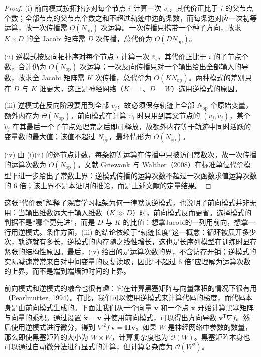 \documentclass[../../main.tex]{subfiles}
\begin{document}
\begin{proof}
(i) 前向模式按拓扑序对每个节点 $i$ 计算一次 $\dot{v}_i$，其代价正比于 $i$ 的父节点个数；全部节点的父节点个数之和不超过轨迹中边的条数，而每条边对应一次初等运算，故一次传播需 $O(N_{\mathrm{op}})$ 次运算。一次传播只携带一个种子方向，故求 $K\times D$ 的全 Jacobi 矩阵需 $D$ 次传播，总代价为 $O(DN_{\mathrm{op}})$。

(ii) 逆模式按反向拓扑序对每个节点 $i$ 计算一次 $\bar{v}_i$，其代价正比于 $i$ 的子节点个数，合计仍为 $O(N_{\mathrm{op}})$ 次运算；一次反向传播只对一个输出给出全部输入的导数，故求全 Jacobi 矩阵需 $K$ 次传播，总代价为 $O(KN_{\mathrm{op}})$。两种模式的差别只在 $D$ 与 $K$ 谁更大，这正是神经网络（$K=1$、$D=W$）选用逆模式的原因。

(iii) 逆模式在反向阶段要用到全部 $v_j$，故必须保存轨迹上全部 $N_{\mathrm{op}}$ 个原始变量，额外内存为 $\Theta(N_{\mathrm{op}})$。前向模式在计算 $\dot{v}_i$ 时只用到其父节点的 $(v_j,\dot{v}_j)$，某个 $\dot{v}_j$ 在其最后一个子节点处理完之后即可释放，故额外内存等于轨迹中同时活跃的变量数的最大值；该值不超过 $N_{\mathrm{op}}$，最坏情形为 $O(N_{\mathrm{op}})$。

(iv) 由 (i)(ii) 的逐节点计数，每条初等运算在传播中只被访问常数次，故一次传播的运算次数为 $O(N_{\mathrm{op}})$。文献 Griewank 与 Walther（2008）在标准单位代价模型下进一步给出了常数上界：逆模式传播的运算次数不超过一次函数求值运算次数的 $6$ 倍；该上界不是本证明的推论，而是上述文献的定量结果。
\end{proof}

\begin{remark}
这张“代价表”解释了深度学习框架为何一律默认逆模式，也说明了前向模式并非无用：当输出维数远大于输入维数（$K\gg D$）时，前向模式反而更省。选择模式的判据不是“哪个更先进”，而是 $D$ 与 $K$ 的比值：想拿Jacobi的一列用前向，想拿一行用逆模式。条件方面，(iii) 的结论依赖于“轨迹长度”这一概念：循环被展开多少次，轨迹就有多长，逆模式的内存随之线性增长，这也是长序列模型在训练时显存紧张的结构性原因。最后，(iv) 给出的是运算次数的界，不含访存开销；逆模式的实际减速常常来自对中间变量的反复读取，因此“不超过 6 倍”应理解为运算次数的上界，而不是端到端墙钟时间的上界。
\end{remark}

前向模式和逆模式的融合也很有趣：它在计算黑塞矩阵与向量乘积的情况下很有用（Pearlmutter, 1994）。在此，我们可以使用逆模式来计算代码的梯度，而代码本身是由前向模式生成的。下面让我们从一个向量 $\mathbf{v}$ 和一个点 $\mathbf{x}$ 开始计算黑塞矩阵与向量的乘积。通过设置 $\dot{\mathbf{x}}=\mathbf{v}$ 并使用前向模式，可以得出方向导数 $\mathbf{v}^{\mathsf T}\nabla f$。然后使用逆模式进行微分，得到 $\nabla^{2}f\,\mathbf{v}=\mathbf{H}\mathbf{v}$。如果 $W$ 是神经网络中参数的数量，那么即使黑塞矩阵的大小为 $W\times W$，计算复杂度也为 $\mathcal{O}(W)$。黑塞矩阵本身也可以通过自动微分法进行显式的计算，但计算复杂度为 $\mathcal{O}(W^{2})$。
\end{document}
